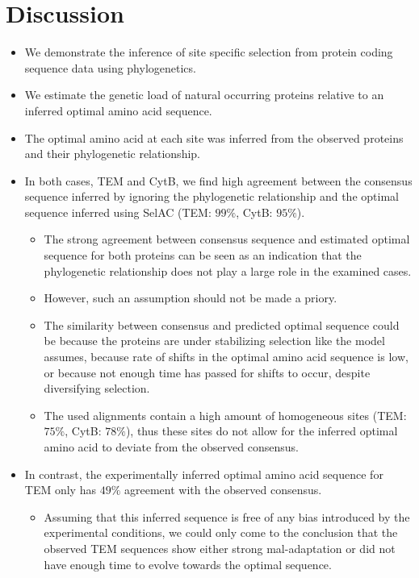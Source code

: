 \documentclass[12pt]{article}
\begin{document}
\section*{Discussion}
\begin{itemize}
	\item We demonstrate the inference of site specific selection from protein coding sequence data using phylogenetics.
	\item We estimate the genetic load of natural occurring proteins relative to an inferred optimal amino acid sequence.
	\item The optimal amino acid at each site was inferred from the observed proteins and their phylogenetic relationship.
	\item In both cases, TEM and CytB, we find high agreement between the consensus sequence inferred by ignoring the phylogenetic relationship and the optimal sequence inferred using SelAC (TEM: $99 \%$, CytB: $95 \%$).
	\begin{itemize}
		\item The strong agreement between consensus sequence and estimated optimal sequence for both proteins can be seen as an indication that the phylogenetic relationship does not play a large role in the examined cases.
		\item However, such an assumption should not be made a priory.
		\item The similarity between consensus and predicted optimal sequence could be because the proteins are under stabilizing selection like the model assumes, because rate of shifts in the optimal amino acid sequence is low, or because not enough time has passed for shifts to occur, despite diversifying selection.
		\item The used alignments contain a high amount of homogeneous sites (TEM: $ 75 \%$, CytB: $78 \%$), thus these sites do not allow for the inferred optimal amino acid to deviate from the observed consensus.
	\end{itemize}
	\item In contrast, the experimentally inferred optimal amino acid sequence for TEM only has $49 \%$ agreement with the observed consensus.
	\begin{itemize}
		\item Assuming that this inferred sequence is free of any bias introduced by the experimental conditions, we could only come to the conclusion that the observed TEM sequences show either strong mal-adaptation or did not have enough time to evolve towards the optimal sequence.

\end{itemize}
\end{itemize}
\end{document}
